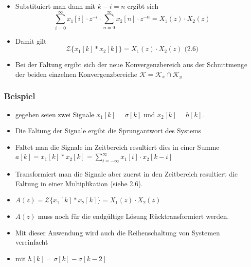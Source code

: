 \documentclass[11pt]{article}
\providecommand{\tightlist}{%
      \setlength{\itemsep}{0pt}\setlength{\parskip}{0pt}}
\begin{document}
    \begin{itemize}
\tightlist
\item
  Substituiert man dann mit \(k-i = n\) ergibt sich
  \[\sum_{i=0}^\infty x_1[i] \cdot z^{-i} \cdot \sum_{n=0}^\infty x_2[n] \cdot z^{-n} = X_1(z) \cdot X_2(z)\]
\end{itemize}

    \begin{itemize}
\tightlist
\item
  Damit gilt
  \[\mathcal{Z} \{x_1[k] * x_2[k]\} = X_1(z) \cdot X_2(z)\textrm{  (2.6)}\]
\end{itemize}

    \begin{itemize}
\tightlist
\item
  Bei der Faltung ergibt sich der neue Konvergenzbereich aus der
  Schnittmenge der beiden einzelnen Konvergenzbereiche
  \(\mathcal{K} = \mathcal{K}_x \cap \mathcal{K}_y\)
\end{itemize}

    \subsubsection{Beispiel}\label{beispiel}

\begin{itemize}
\item
  gegeben seien zwei Signale \(x_1[k] = \sigma[k]\) und
  \(x_2[k] = h[k]\).
\item
  Die Faltung der Signale ergibt die Sprungantwort des Systems
\item
  Faltet man die Signale im Zeitbereich resultiert dies in einer Summe
  \(a[k] = x_1[k] * x_2[k] = \sum_{i=-\infty}^{\infty} x_1[i] \cdot x_2[k-i]\)
\item
  Transformiert man die Signale aber zuerst in den Zeitbereich
  resultiert die Faltung in einer Multiplikation (siehe 2.6).
\item
  \(A(z) = \mathcal{Z} \{x_1[k] * x_2[k]\} = X_1(z) \cdot X_2(z)\)
\item
  \(A(z)\) muss noch für die endgültige Lösung Rücktransformiert werden.
\item
  Mit dieser Anwendung wird auch die Reihenschaltung von Systemen
  vereinfacht
\end{itemize}

    \begin{itemize}
\tightlist
\item
  mit \(h[k] = \sigma[k] - \sigma[k-2]\)
\end{itemize}
\end{document}
